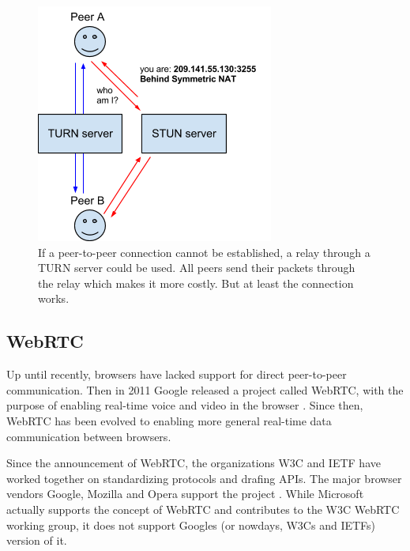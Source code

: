 \begin{figure}[htp]
\centering
\includegraphics[width=\textwidth,height=0.2\paperheight,keepaspectratio
]{figures/webrtc-turn}
\caption{If a peer-to-peer connection cannot be established, a relay through a TURN server could be used. All peers send their packets through the relay which makes it more costly. But at least the connection works\cite{WebRTCArchitecture:2014:Online}.}
\label{fig:WebRTC - TURN}
\end{figure}

\subsection{WebRTC}

Up until recently, browsers have lacked support for direct peer-to-peer communication. Then in 2011 Google released a project called WebRTC, with the purpose of enabling real-time voice and video in the browser \cite{WebRTCMemo:Online}. Since then, WebRTC has been evolved to enabling more general real-time data communication between browsers\cite{WebRTC:Online}. 

Since the announcement of WebRTC, the organizations W3C and IETF have worked together on standardizing protocols and drafing APIs. The major browser vendors Google, Mozilla and Opera support the project \cite{WebRTCAndMicrosoft:2012:Online}. While Microsoft actually supports the concept of WebRTC and contributes to the W3C WebRTC working group, it does not support Googles (or nowdays, W3Cs and IETFs) version of it\cite{WebRTCAndMicrosoft:2012:Online}.


